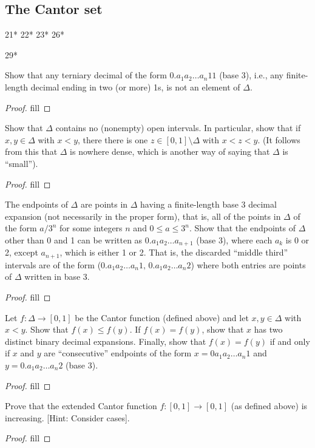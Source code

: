 \subsection{The Cantor set}

21*
22*
23*
26*

29*

\begin{exercise}{21}
Show that any terniary decimal of the form $0.a_1a_2\dots a_n11$ (base 3), i.e., any finite-length decimal ending in two (or more) 1s, is not an element of $\Delta$.
\end{exercise}
\begin{proof}
fill
\end{proof} 

\begin{exercise}{22}
Show that $\Delta$ contains no (nonempty) open intervals. In particular, show that if $x,y\in\Delta$ with $x<y$, there there is one $z\in[0,1]\setminus\Delta$ with $x<z<y$. (It follows from this that $\Delta$ is nowhere dense, which is another way of saying that $\Delta$ is ``small'').
\end{exercise}
\begin{proof}
fill
\end{proof} 

\begin{exercise}{23}
The endpoints of $\Delta$ are points in $\Delta$ having a finite-length base 3 decimal expansion (not necessarily in the proper form), that is, all of the points in $\Delta$ of the form $a/3^n$ for some integers $n$ and $0\leq a\leq 3^n$. Show that the endpoints of $\Delta$ other than 0 and 1 can be written as $0.a_1a_2\dots a_{n+1}$ (base 3), where each $a_k$ is 0 or 2, except $a_{n+1}$, which is either 1 or 2. That is, the discarded ``middle third'' intervals are of the form ($0.a_1a_2\dots a_{n}1,\, 0.a_1a_2\dots a_n2$) where both entries are points of $\Delta$ written in base 3.
\end{exercise}
\begin{proof}
fill
\end{proof} 

\begin{exercise}{26}
Let $f:\Delta\to[0,1]$ be the Cantor function (defined above) and let $x,y\in\Delta$ with $x<y$. Show that $f(x)\leq f(y)$. If $f(x)=f(y)$, show that $x$ has two distinct binary decimal expansions. Finally, show that $f(x)=f(y)$ if and only if $x$ and $y$ are ``consecutive'' endpoints of the form $x=0a_1a_2\dots a_n1$ and $y=0.a_1a_2\dots a_n2$ (base 3).
\end{exercise}
\begin{proof}
fill
\end{proof} 

\begin{exercise}{29}
Prove that the extended Cantor function $f:[0,1]\to[0,1]$ (as defined above) is increasing. [Hint: Consider cases].
\end{exercise}
\begin{proof}
fill
\end{proof}
